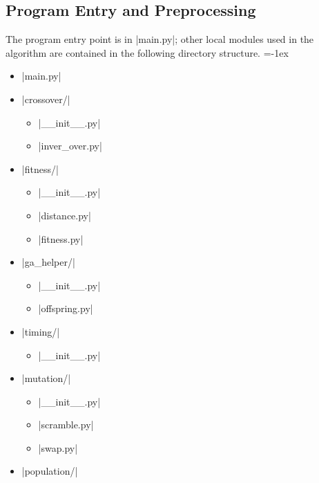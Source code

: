 \subsection{Program Entry and Preprocessing}
The program entry point is in |main.py|; other local modules used in the 
algorithm are contained in the following directory structure.
\bgroup
\footnotesize
\itemsep=-1ex
\setlength{\columnsep}{-24pt}
\begin{multicols}{2}
\raggedbottom
\begin{itemize}[topsep=-12pt,leftmargin=22pt]
	\item[\file] |main.py|
	\item[\folder] |crossover/|
	\begin{itemize}[topsep=-1ex,leftmargin=12pt,itemsep=-.5ex]
		\item[\file] |__init__.py|
		\item[\file] |inver_over.py|
	\end{itemize}
	\item[\folder] |fitness/|
	\begin{itemize}[topsep=-1ex,leftmargin=12pt,itemsep=-.5ex]
		\item[\file] |__init__.py|
		\item[\file] |distance.py|
		\item[\file] |fitness.py|
	\end{itemize}
	\item[\folder] |ga_helper/|
	\begin{itemize}[topsep=-1ex,leftmargin=12pt,itemsep=-.5ex]
		\item[\file] |__init__.py|
		\item[\file] |offspring.py|
	\end{itemize}
	\item[\folder] |timing/|
	\begin{itemize}[topsep=-1ex,leftmargin=12pt,itemsep=-.5ex]
		\item[\file] |__init__.py|
	\end{itemize}
	\vfill\null
	\columnbreak
	\item[\folder] |mutation/|
	\begin{itemize}[topsep=-1ex,leftmargin=12pt,itemsep=-.5ex]
		\item[\file] |__init__.py|
		\item[\file] |scramble.py|
		\item[\file] |swap.py|
	\end{itemize}
	\item[\folder] |population/|

\end{itemize}
\end{multicols}
